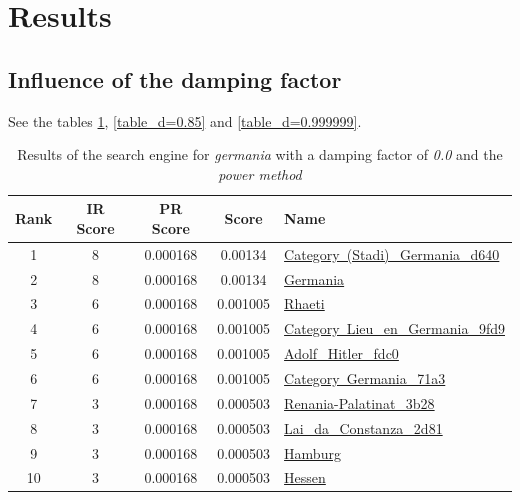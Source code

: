 \documentclass[pdftex,12pt,a4paper]{article}
\begin{document}
\section{Results}

\subsection{Influence of the damping factor}

See the tables \ref{table_d=0.0}, \ref{table_d=0.85} and \ref{table_d=0.999999}.

\begin{table}[H]
\centering
\begin{tabular}{ | c | c | c | c | l | }
\hline
Rank & IR Score & PR Score &  Score & Name \\ \hline
1 & 8 & 0.000168 & 0.00134 & \href{http://rm.wikipedia.org/wiki/Category~(Stadi)_Germania_d640}{Category~(Stadi)\_Germania\_d640} \\ \hline
2 & 8 & 0.000168 & 0.00134 & \href{http://rm.wikipedia.org/wiki/Germania}{Germania} \\ \hline
3 & 6 & 0.000168 & 0.001005 & \href{http://rm.wikipedia.org/wiki/Rhaeti}{Rhaeti} \\ \hline
4 & 6 & 0.000168 & 0.001005 & \href{http://rm.wikipedia.org/wiki/Category~Lieu_en_Germania_9fd9}{Category~Lieu\_en\_Germania\_9fd9} \\ \hline
5 & 6 & 0.000168 & 0.001005 & \href{http://rm.wikipedia.org/wiki/Adolf_Hitler_fdc0}{Adolf\_Hitler\_fdc0} \\ \hline
6 & 6 & 0.000168 & 0.001005 & \href{http://rm.wikipedia.org/wiki/Category~Germania_71a3}{Category~Germania\_71a3} \\ \hline
7 & 3 & 0.000168 & 0.000503 & \href{http://rm.wikipedia.org/wiki/Renania-Palatinat_3b28}{Renania-Palatinat\_3b28} \\ \hline
8 & 3 & 0.000168 & 0.000503 & \href{http://rm.wikipedia.org/wiki/Lai_da_Constanza_2d81}{Lai\_da\_Constanza\_2d81} \\ \hline
9 & 3 & 0.000168 & 0.000503 & \href{http://rm.wikipedia.org/wiki/Hamburg}{Hamburg} \\ \hline
10 & 3 & 0.000168 & 0.000503 & \href{http://rm.wikipedia.org/wiki/Hessen}{Hessen} \\ \hline
\end{tabular}
\caption{Results of the search engine for \emph{germania} with a damping factor of \emph{0.0} and the \emph{power method}}
\label{table_d=0.0}
\end{table}
\end{document}

